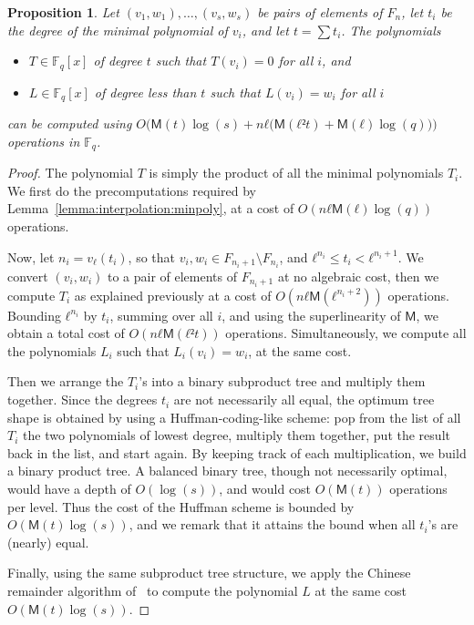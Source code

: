\documentclass{lms}
\newtheorem{prop}[thm]{Proposition}
\def\cout#1{\mathsf{#1}}
\newcommand{\F}{\mathbb{F}}
\newcommand{\MM}{\cout{M}}
\begin{document}
\begin{prop}\label{prop:interpol}
  Let $(v_1,w_1),\dots,(v_s,w_s)$ be pairs of elements of $F_n$, let
  $t_i$ be the degree of the minimal polynomial of $v_i$, and let
  $t=\sum t_i$. The polynomials
  \begin{itemize}
  \item $T∈\F_q[x]$ of degree $t$ such that $T(v_i)=0$ for all $i$,
    and
  \item $L∈\F_q[x]$ of degree less than $t$ such that $L(v_i)=w_i$ for
    all $i$
  \end{itemize}
  can be computed using
  $O\bigl(\MM(t)\log(s) + nℓ\bigl(\MM(ℓ²t) +
  \MM(ℓ)\log(q)\bigr)\bigr)$ operations in $\F_q$.
\end{prop}
\begin{proof}
  The polynomial $T$ is simply the product of all the minimal
  polynomials $T_i$. We first do the precomputations required by
  Lemma~\ref{lemma:interpolation:minpoly}, at a cost of
  $O(nℓ\MM(ℓ)\log(q))$ operations.

  Now, let $n_i=v_ℓ(t_i)$, so that
  $v_i,w_i∈F_{n_i+1}\setminus F_{n_i}$, and $ℓ^{n_i}≤t_i<ℓ^{n_i+1}$.
  We convert $(v_i,w_i)$ to a pair of elements of $F_{n_i+1}$ at no
  algebraic cost, then we compute $T_i$ as explained previously at a
  cost of $O(nℓ\MM(ℓ^{n_i+2}))$ operations. Bounding $ℓ^{n_i}$ by
  $t_i$, summing over all $i$, and using the superlinearity of $\MM$,
  we obtain a total cost of $O(nℓ\MM(ℓ²t))$ operations.
  Simultaneously, we compute all the polynomials $L_i$ such that
  $L_i(v_i)=w_i$, at the same cost.

  Then we arrange the $T_i$'s into a binary subproduct tree and
  multiply them together. Since the degrees $t_i$ are not necessarily
  all equal, the optimum tree shape is obtained by using a
  Huffman-coding-like scheme: pop from the list of all $T_i$ the two
  polynomials of lowest degree, multiply them together, put the result
  back in the list, and start again. By keeping track of each
  multiplication, we build a binary product tree. A balanced binary
  tree, though not necessarily optimal, would have a depth of
  $O(\log (s))$, and would cost $O(\MM(t))$ operations per level. Thus
  the cost of the Huffman scheme is bounded by $O(\MM(t)\log(s))$, and
  we remark that it attains the bound when all $t_i$'s are (nearly)
  equal.

  Finally, using the same subproduct tree structure, we apply the
  Chinese remainder algorithm of~\cite[Chapter~10]{vzGG} to compute
  the polynomial $L$ at the same cost $O(\MM(t)\log(s))$.
\end{proof}
\end{document}
